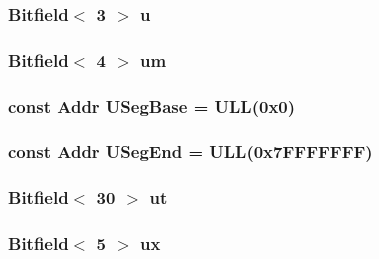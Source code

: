 \label{namespaceMipsISA_a03a5e2158a849bce2f5bbef022f4b9e0}
\hypertarget{namespaceMipsISA_a2fc27c327acf2caaf8abc0ce0bd17aa7}{
\subsubsection[{u}]{\setlength{\rightskip}{0pt plus 5cm}Bitfield$<$ 3 $>$ {\bf u}}}
\label{namespaceMipsISA_a2fc27c327acf2caaf8abc0ce0bd17aa7}
\hypertarget{namespaceMipsISA_abf0b3e2a829fb27d854c8201382792c5}{
\subsubsection[{um}]{\setlength{\rightskip}{0pt plus 5cm}Bitfield$<$ 4 $>$ {\bf um}}}
\label{namespaceMipsISA_abf0b3e2a829fb27d854c8201382792c5}
\hypertarget{namespaceMipsISA_a9d54e751f7acdb2ea3b820539047d085}{
\subsubsection[{USegBase}]{\setlength{\rightskip}{0pt plus 5cm}const {\bf Addr} {\bf USegBase} = ULL(0x0)}}
\label{namespaceMipsISA_a9d54e751f7acdb2ea3b820539047d085}
\hypertarget{namespaceMipsISA_a42b44a1d23d813c474aef63cd9c7a729}{
\subsubsection[{USegEnd}]{\setlength{\rightskip}{0pt plus 5cm}const {\bf Addr} {\bf USegEnd} = ULL(0x7FFFFFFF)}}
\label{namespaceMipsISA_a42b44a1d23d813c474aef63cd9c7a729}
\hypertarget{namespaceMipsISA_aa871a0e4096d20e353a39d933932e2b8}{
\subsubsection[{ut}]{\setlength{\rightskip}{0pt plus 5cm}Bitfield$<$ 30 $>$ {\bf ut}}}
\label{namespaceMipsISA_aa871a0e4096d20e353a39d933932e2b8}
\hypertarget{namespaceMipsISA_afc2b03c55af2f2f9166326e6dc58da97}{
\subsubsection[{ux}]{\setlength{\rightskip}{0pt plus 5cm}Bitfield$<$ 5 $>$ {\bf ux}}}
